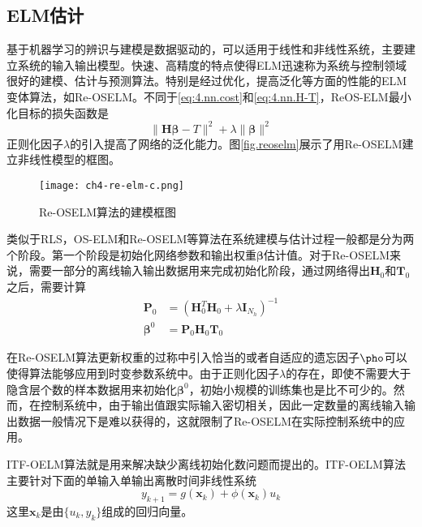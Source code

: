 \subsection{ELM估计}
基于机器学习的辨识与建模是数据驱动的，可以适用于线性和非线性系统，主要建立系统的输入输出模型。快速、高精度的特点使得ELM迅速称为系统与控制领域很好的建模、估计与预测算法。特别是经过优化，提高泛化等方面的性能的ELM变体算法，如Re-OSELM。不同于\eqref{eq:4.nn.cost}和\eqref{eq:4.nn.H-T}，ReOS-ELM最小化目标的损失函数是
\begin{equation}\label{eq:4.re.cost}
\|\bm{H}\bm{\beta}-T\|^{2}+\lambda\|\bm{\beta}\|^{2}
\end{equation}
正则化因子$\lambda$的引入提高了网络的泛化能力。图\eqref{fig.reoselm}展示了用Re-OSELM建立非线性模型的框图。

\begin{figure}[!htb]
  \centering
  \texttt{[image: ch4-re-elm-c.png]}\\	 %
  \caption{Re-OSELM算法的建模框图}
  \label{fig.reoselm}
\end{figure}

类似于RLS，OS-ELM和Re-OSELM等算法在系统建模与估计过程一般都是分为两个阶段。第一个阶段是初始化网络参数和输出权重$\bm{\beta}$估计值。对于Re-OSELM来说，需要一部分的离线输入输出数据用来完成初始化阶段，通过网络得出$\bm{H}_{0}$和$\bm{T}_{0}$之后，需要计算
\begin{equation}
\begin{split}%
\bm{P}_{0}&=(\bm{H}_{0}^{T}\bm{H}_{0}+\lambda \bm{I}_{N_{h}})^{-1}\\
\bm{\beta}^{0}&=\bm{P}_{0}\bm{H}_{0}\bm{T}_{0}
\end{split}
\end{equation}

在Re-OSELM算法更新权重的过称中引入恰当的或者自适应的遗忘因子$\pho$可以使得算法能够应用到时变参数系统中。由于正则化因子$\lambda$的存在，即使不需要大于隐含层个数的样本数据用来初始化$\bm{\beta}^{0}$，初始小规模的训练集也是比不可少的。然而，在控制系统中，由于输出值跟实际输入密切相关，因此一定数量的离线输入输出数据一般情况下是难以获得的，这就限制了Re-OSELM在实际控制系统中的应用。

ITF-OELM算法就是用来解决缺少离线初始化数问题而提出的。ITF-OELM算法主要针对下面的单输入单输出离散时间非线性系统
\begin{equation}\label{eq:4.siso}
y_{k+1} = g(\bm{x}_{k})+\phi(\bm{x}_{k})u_{k}
\end{equation}
这里$\bm{x}_{k}$是由$\{u_{k},y_{k}\}$组成的回归向量。

